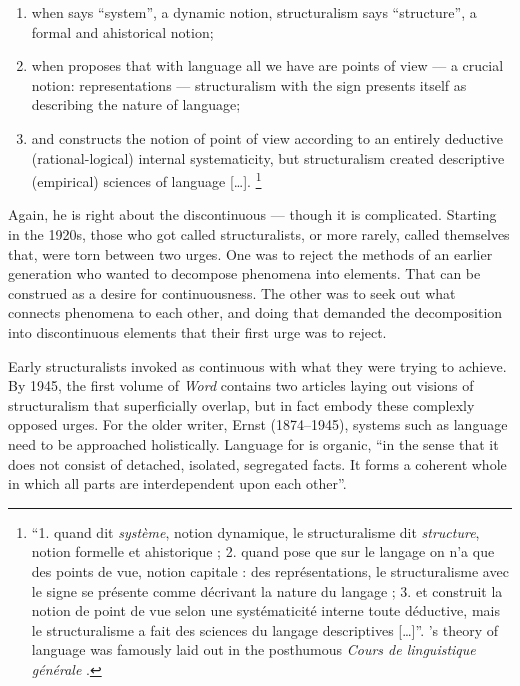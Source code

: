 \documentclass[output=paper]{langscibook}
\begin{document}
\begin{enumerate}
    \item when {\Saussure} says ``system'', a dynamic notion, structuralism says ``structure'', a formal and ahistorical notion;
    \item when {\Saussure} proposes that with language all we have are points of view — a crucial notion: representations — structuralism with the sign presents itself as describing the nature of language;
    \item and {\Saussure} constructs the notion of point of view according to an entirely deductive (rational-logical) internal systematicity, but structuralism created descriptive (empirical) sciences of language […]. \linebreak\citep[20]{Meschonnic2009}\footnote{``1. quand {\Saussure} dit \emph{système}, notion dynamique, le structuralisme dit \emph{structure}, notion formelle et ahistorique ; 2. quand {\Saussure} pose que sur le langage on n'a que des points de vue, notion capitale : des représentations, le structuralisme avec le signe se présente comme décrivant la nature du langage ; 3. et {\Saussure} construit la notion de point de vue selon une systématicité interne toute déductive, mais le structuralisme a fait des sciences du langage descriptives […]''. {\Saussure}'s theory of language was famously laid out in the posthumous \emph{Cours de linguistique générale} \citep{Saussure19221916}.}
\end{enumerate}

Again, he is right about the discontinuous — though it is complicated. Starting in the 1920s, those who got called structuralists, or more rarely, called themselves that, were torn between two urges. One was to reject the methods of an earlier generation who wanted to decompose phenomena into elements. That can be construed as a desire for continuousness. The other was to seek out what connects phenomena to each other, and doing that demanded the decomposition into discontinuous elements that their first urge was to reject.

Early structuralists invoked  as continuous with what they were trying to achieve. By 1945, the first volume of \emph{Word} contains two articles laying out visions of structuralism that superficially overlap, but in fact embody these complexly opposed urges. For the older writer, Ernst {\Cassirer} (1874--1945), systems such as language need to be approached holistically. Language for \citet[110]{Cassirer1945} is organic, ``in the sense that it does not consist of detached, isolated, segregated facts. It forms a coherent whole in which all parts are interdependent upon each other''.
\end{document}
